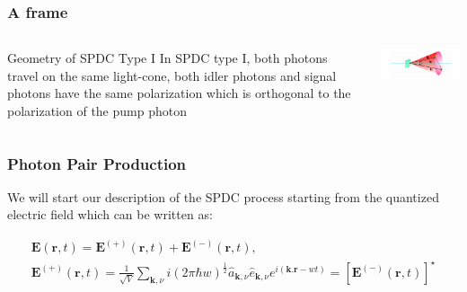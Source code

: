 \documentclass[]{beamer}
\begin{document}
\begin{frame}
\frametitle{A frame}
  \begin{columns}[T]
    \begin{column}{.5\textwidth}
     \begin{block}{Geometry of SPDC Type I}
     In SPDC type I, both photons travel on the same light-cone, both idler photons and signal photons have the same polarization which is orthogonal to the polarization of the pump photon
    \end{block}
    \end{column}
    \begin{column}{.5\textwidth}
    \begin{block}{}
    \includegraphics[width=\textwidth]{images/spdc_I.png}
    \end{block}
    \end{column}
  \end{columns}
\end{frame}

  \begin{frame}
    \frametitle{Photon Pair Production}
We will start our description of the SPDC process starting from the quantized electric field which can be written as:

\begin{align}
\textbf{E}(\textbf{r},t)=\textbf{E}^{(+)} (\textbf{r},t) + \textbf{E}^{(-)} (\textbf{r},t),\\
\textbf{E}^{(+)} (\textbf{r},t)=\frac{1}{\sqrt{V}} \sum_{\textbf{k},\nu} i(2 \pi \hbar w)^{\frac{1}{2}} \hat{a}_{\textbf{k},\nu} \hat{e}_{\textbf{k},\nu} e^{i(\textbf{k.r}-wt)}=[\textbf{E}^{(-)} (\textbf{r},t)]^{\star}
\end{align}
  \end{frame}
\end{document}
